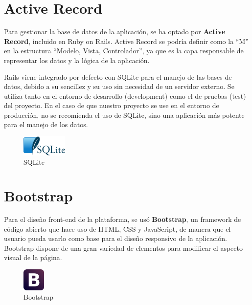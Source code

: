 \section{Active Record}
\label{3:sec:2}

Para gestionar la base de datos de la aplicación, se ha optado por \textbf{Active Record}\cite{Active}, incluido en Ruby on Rails. Active Record se podría definir como la ``M'' en la estructura ``Modelo, Vista, Controlador'', ya que es la capa responsable de representar los datos y la lógica de la aplicación.

Rails viene integrado por defecto con SQLite para el manejo de las bases de datos, debido a su sencillez y su uso sin necesidad de un servidor externo. Se utiliza tanto en el entorno de desarrollo (development) como el de pruebas (test) del proyecto. 
En el caso de que nuestro proyecto se use en el entorno de producción, no se recomienda el uso de SQLite, sino una aplicación más potente para el manejo de los datos.

\begin{figure}[!th]
\begin{center}
\includegraphics[width=0.2\textwidth]{images/logo_sqlite.eps}
\caption{SQLite}
\label{fig:5}
\end{center}
\end{figure}


\section{Bootstrap}
\label{3:sec:3}

Para el diseño front-end de la plataforma, se usó \textbf{Bootstrap}\cite{Bootstrap}, un framework de código abierto que hace uso de HTML, CSS y JavaScript, de manera que el usuario pueda usarlo como base para el diseño responsivo de la aplicación. Bootstrap dispone de una gran variedad de elementos para modificar el aspecto visual
de la página.

\begin{figure}[!th]
\begin{center}
\includegraphics[width=0.1\textwidth]{images/logo_bootstrap.eps}
\caption{Bootstrap}
\label{fig:6}
\end{center}
\end{figure}

